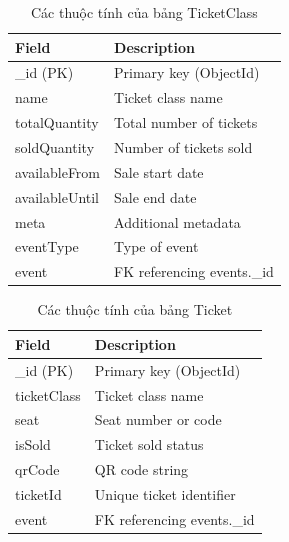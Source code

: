 \begin{table}[H]
\centering
\begin{tabular}{|p{4.5cm}|p{6cm}|}
\hline
\textbf{Field} & \textbf{Description} \\ \hline
\_id (PK) & Primary key (ObjectId) \\ \hline
name & Ticket class name \\ \hline
totalQuantity & Total number of tickets \\ \hline
soldQuantity & Number of tickets sold \\ \hline
availableFrom & Sale start date \\ \hline
availableUntil & Sale end date \\ \hline
meta & Additional metadata \\ \hline
eventType & Type of event \\ \hline
event & FK referencing events.\_id \\ \hline
\end{tabular}
\vspace{15pt}
\caption{Các thuộc tính của bảng TicketClass}
\end{table}

\begin{table}[H]
\centering
\begin{tabular}{|p{4.5cm}|p{6cm}|}
\hline
\textbf{Field} & \textbf{Description} \\ \hline
\_id (PK) & Primary key (ObjectId) \\ \hline
ticketClass & Ticket class name \\ \hline
seat & Seat number or code \\ \hline
isSold & Ticket sold status \\ \hline
qrCode & QR code string \\ \hline
ticketId & Unique ticket identifier \\ \hline
event & FK referencing events.\_id \\ \hline
\end{tabular}
\vspace{15pt}
\caption{Các thuộc tính của bảng Ticket}
\end{table}

